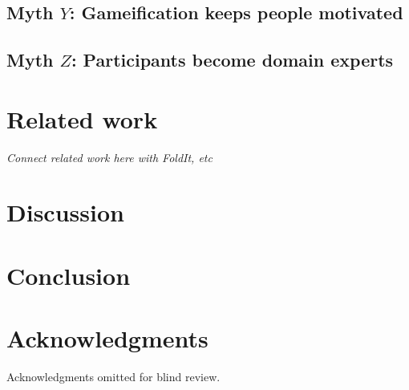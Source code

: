 \documentclass{sigchi}
\begin{document}
\subsection{Myth $Y$: Gameification keeps people motivated}

\subsection{Myth $Z$: Participants become domain experts}

\section{Related work}

\emph{Connect related work here with FoldIt, etc}

\section{Discussion}

\section{Conclusion}

\section{Acknowledgments}
Acknowledgments omitted for blind review.

\balance



\end{document}

